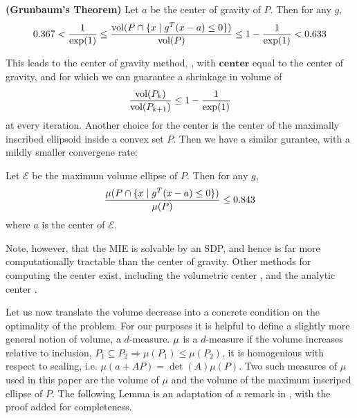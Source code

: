 \begin{thm} {\bf (Grunbaum's Theorem)} \label{thm:CG_cut} 
Let $a$ be the center of gravity of $P$. Then for any $g$,
$$
 0.367 < \frac{1}{\exp(1)} \leq \frac{\textnormal{vol}(P \cap \{ x \mid g^T(x - a)\leq 0\}) }{\textnormal{vol}(P)} \leq 1- \frac{1}{\exp(1)} < 0.633
$$
\end{thm}



This leads to the center of gravity method,
\cite{levin1965algorithm,newman1965location}, with $\mathbf{center}$
equal to the center of gravity, and for which we can guarantee a shrinkage
in volume of 
$$\frac{\textnormal{vol}(P_k)}{\textnormal{vol}(P_{k+1})} \leq 1 - \frac{1}{\exp(1)} $$ 
at every iteration. Another choice for the center is the center of the
maximally inscribed ellipsoid inside a convex set $P$. Then we have a
similar gurantee, with a mildly smaller convergene rate:

\begin{thm} \label{thm:MIE_cut} \cite{tarasov1988method} 
Let $\mathcal{E}$ be the maximum volume ellipse of $P$. Then for any $g$,
$$
\frac{\mu(P \cap \{ x \mid g^T(x - a)\leq 0\}) }{\mu(P)} \leq 0.843  
$$
where $a$ is the center of $\mathcal{E}$.
\end{thm}

Note, however, that the MIE is solvable by an SDP, and hence is far
more computationally tractable than the center of gravity. Other 
methods for computing the center exist, including  the volumetric center
\cite{vaidya1989new}, and the analytic center \cite{ye1996complexity}.

Let us now translate the volume decrease into a concrete condition on
the optimality of the problem. For our purposes
it is helpful to define a slightly more general notion of volume, a
$d$-measure. $\mu$ is a $d$-measure if the volume increases relative to
inclusion, $P_1 \subseteq P_2 \Rightarrow \mu(P_1) \leq \mu(P_2)$, it is
homogenious with respect to scaling, i.e. $\mu(a+AP)=\det(A)\mu(P)$. Two such
measures of $\mu$ used in this paper are the volume of $\mu$ and the volume of
the maximum inscriped ellipse of $P$. The following Lemma is an adaptation of
a remark in \cite{tarasov1988method}, with the proof added for completeness.

